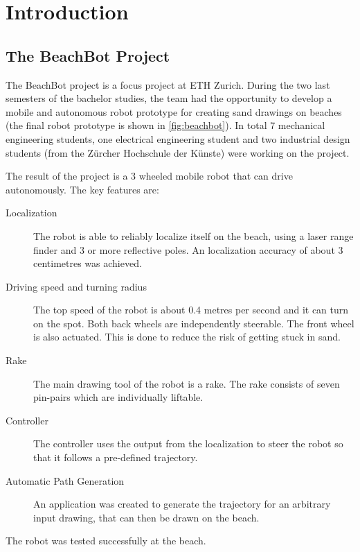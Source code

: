 \chapter{Introduction}
\section{The BeachBot Project}
The BeachBot project is a focus project at ETH Zurich. During the two last semesters of the bachelor studies, the team had the opportunity to develop a mobile and autonomous robot prototype for creating sand drawings on beaches (the final robot prototype is shown in \autoref{fig:beachbot}). In total 7 mechanical engineering students, one electrical engineering student and two industrial design students (from the Zürcher Hochschule der Künste) were working on the project. 

The result of the project is a 3 wheeled mobile robot that can drive autonomously. The key features are:
\begin{description}
\item[Localization] The robot is able to reliably localize itself on the beach, using a laser range finder and 3 or more reflective poles. An localization accuracy of about 3 centimetres was achieved.
\item[Driving speed and turning radius] The top speed of the robot is about 0.4 metres per second and it can turn on the spot. Both back wheels are independently steerable. The front wheel is also actuated. This is done to reduce the risk of getting stuck in sand.
\item[Rake] The main drawing tool of the robot is a rake. The rake consists of seven pin-pairs which are individually liftable.
\item[Controller] The controller uses the output from the localization to steer the robot so that it follows a pre-defined trajectory.
\item[Automatic Path Generation] An application was created to generate the trajectory for an arbitrary input drawing, that can then be drawn on the beach.
\end{description}

The robot was tested successfully at the beach.

